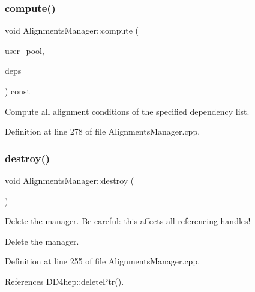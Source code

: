 \subsubsection{\texorpdfstring{compute()}{compute()}\hspace{0.1cm}{\footnotesize\ttfamily [2/2]}}
{\footnotesize\ttfamily void Alignments\+Manager\+::compute (\begin{DoxyParamCaption}\item[{\hyperlink{class_d_d4hep_1_1dd4hep__ptr}{dd4hep\+\_\+ptr}$<$ \hyperlink{class_d_d4hep_1_1_conditions_1_1_user_pool}{User\+Pool} $>$ \&}]{user\+\_\+pool,  }\item[{const \hyperlink{class_d_d4hep_1_1_alignments_1_1_alignments_manager_ae8068cb8b252db1243c87eccad69e980}{Dependencies} \&}]{deps }\end{DoxyParamCaption}) const}



Compute all alignment conditions of the specified dependency list. 



Definition at line 278 of file Alignments\+Manager.\+cpp.

\hypertarget{class_d_d4hep_1_1_alignments_1_1_alignments_manager_aa4254e4ad73fb728b05d8c4134f1b7ac}{}\label{class_d_d4hep_1_1_alignments_1_1_alignments_manager_aa4254e4ad73fb728b05d8c4134f1b7ac} 
\subsubsection{\texorpdfstring{destroy()}{destroy()}}
{\footnotesize\ttfamily void Alignments\+Manager\+::destroy (\begin{DoxyParamCaption}{ }\end{DoxyParamCaption})}



Delete the manager. Be careful\+: this affects all referencing handles! 

Delete the manager. 

Definition at line 255 of file Alignments\+Manager.\+cpp.



References D\+D4hep\+::delete\+Ptr().

\hypertarget{class_d_d4hep_1_1_alignments_1_1_alignments_manager_a78dd11bc6f7e7af1bcebca8b1ff8408c}{}\label{class_d_d4hep_1_1_alignments_1_1_alignments_manager_a78dd11bc6f7e7af1bcebca8b1ff8408c} 
